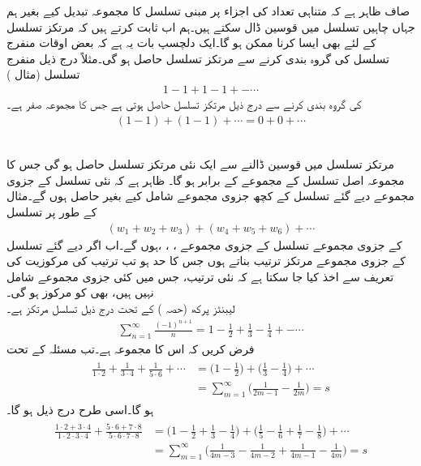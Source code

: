 صاف ظاہر ہے کہ متناہی تعداد کی اجزاء پر مبنی تسلسل کا مجموعہ تبدیل کیے بغیر ہم جہاں چاہیں تسلسل میں قوسین ڈال سکتے ہیں۔ہم اب ثابت کرتے ہیں کہ مرتکز تسلسل کے لئے بھی ایسا کرنا ممکن ہو گا۔ایک دلچسپ بات یہ ہے کہ بعض اوقات منفرج تسلسل کی گروہ بندی کرنے سے مرتکز تسلسل حاصل ہو گی۔مثلاً درج ذیل منفرج تسلسل (مثال )
\begin{align*}
1-1+1-1+-\cdots
\end{align*} 
کی گروہ بندی کرنے سے درج ذیل مرتکز تسلسل حاصل ہوتی ہے جس کا مجموعہ صفر ہے۔
\begin{align*}
(1-1)+(1-1)+\cdots=0+0+\cdots
\end{align*}

\quad {}\\
مرتکز تسلسل میں قوسین ڈالنے سے ایک نئی مرتکز تسلسل حاصل ہو گی جس کا مجموعہ اصل تسلسل کے مجموعے کے برابر ہو گا۔
\quad
ظاہر ہے کہ نئی تسلسل کے جزوی مجموعے دیے گئے تسلسل کے کچھ جزوی مجموعے  شامل کیے بغیر حاصل ہوں گے۔مثال کے طور پر تسلسل
\begin{align*}
(w_1+w_2+w_3)+(w_4+w_5+w_6)+\cdots
\end{align*} 
کے جزوی مجموعے تسلسل  کے جزوی مجموعے  ، ، ، ہوں گے۔اب اگر دیے گئے تسلسل کے جزوی مجموعے  مرتکز ترتیب بناتے ہوں جس کا حد  ہو تب ترتیب کی مرکوزیت کی تعریف سے اخذ کیا جا سکتا ہے کہ نئی ترتیب، جس میں کئی جزوی مجموعے شامل نہیں ہیں، بھی  کو مرکوز ہو گی۔
\quad {}\\
لیبنٹز پرکھ (حصہ ) کے تحت درج ذیل تسلسل مرتکز ہے۔
\begin{align*}
\sum\limits_{n=1}^{\infty} \frac{(-1)^{n+1}}{n}=1-\frac{1}{2}+\frac{1}{3}-\frac{1}{4}+-\cdots
\end{align*}
فرض کریں کہ اس کا مجموعہ  ہے۔تب مسئلہ  کے تحت
\begin{gather}
\begin{aligned}\label{مساوات_ترتیب_تسلسل_ایک}
\frac{1}{1\cdot 2}+\frac{1}{3\cdot 4}+\frac{1}{5\cdot 6}+\cdots&=\big(1-\frac{1}{2}\big)+\big(\frac{1}{3}-\frac{1}{4}\big)+\cdots\\
&=\sum\limits_{m=1}^{\infty}\big(\frac{1}{2m-1}-\frac{1}{2m}\big)=s
\end{aligned}
\end{gather}
ہو گا۔اسی طرح درج ذیل ہو گا۔
\begin{gather}
\begin{aligned}\label{مساوات_ترتیب_تسلسل_دو}
\frac{1\cdot 2+3\cdot 4}{1\cdot 2\cdot 3\cdot 4}+\frac{5\cdot 6+7\cdot 8}{5\cdot 6\cdot 7\cdot 8}&=\big(1-\frac{1}{2}+\frac{1}{3}-\frac{1}{4}\big)+\big(\frac{1}{5}-\frac{1}{6}+\frac{1}{7}-\frac{1}{8}\big)+\cdots\\
&=\sum\limits_{m=1}^{\infty} \big(\frac{1}{4m-3}-\frac{1}{4m-2}+\frac{1}{4m-1}-\frac{1}{4m}\big)=s
\end{aligned}
\end{gather}

